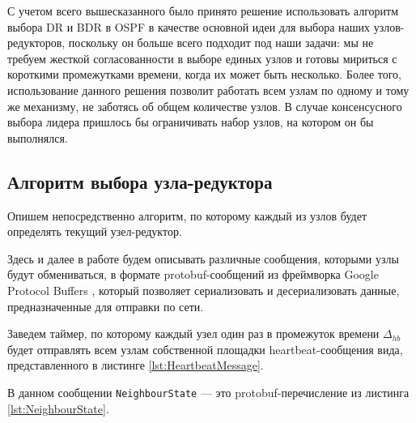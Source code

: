 \documentclass{article}
\theoremstyle{plain}
\theoremstyle{plain}
\theoremstyle{plain}
\theoremstyle{plain}
\theoremstyle{definition}
\theoremstyle{remark}
\theoremstyle{plain}
\begin{document}
С учетом всего вышесказанного было принято решение использовать алгоритм выбора DR и BDR в OSPF в качестве основной идеи для выбора наших узлов-редукторов, поскольку он больше всего подходит под наши задачи: мы не требуем жесткой согласованности в выборе единых узлов и готовы мириться с короткими промежутками времени, когда их может быть несколько. Более того, использование данного решения позволит работать всем узлам по одному и тому же механизму, не заботясь об общем количестве узлов. В случае консенсусного выбора лидера пришлось бы ограничивать набор узлов, на котором он бы выполнялся.

\subsection{Алгоритм выбора узла-редуктора}
\label{ReducersElectionSubsection}

Опишем непосредственно алгоритм, по которому каждый из узлов будет определять текущий узел-редуктор.

Здесь и далее в работе будем описывать различные сообщения, которыми узлы будут обмениваться, в формате protobuf-сообщений из фреймворка Google Protocol Buffers \cite{Google_protobuf}, который позволяет сериализовать и десериализовать данные, предназначенные для отправки по сети.

Заведем таймер, по которому каждый узел один раз в промежуток времени $\Delta_{hb}$ будет отправлять всем узлам собственной площадки heartbeat-со\-об\-ще\-ния вида, представленного в листинге \ref{lst:HeartbeatMessage}.


В данном сообщении \texttt{NeighbourState} --- это protobuf-перечисление из листинга \ref{lst:NeighbourState}.

\end{document}
